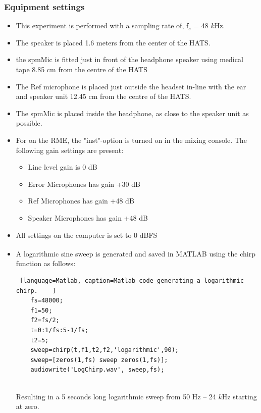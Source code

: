 \subsubsection{Equipment settings}\label{sec:SettingsAngInc}
\begin{itemize}
	\item This experiment is performed with a sampling rate of, f$_{s}$ = 48 $k$Hz.
	\item The speaker is placed 1.6 meters from the center of the HATS.
	\item the spmMic is fitted just in front of the headphone speaker using medical tape 8.85 cm from the centre of the HATS
	\item The Ref microphone is placed just outside the headset in-line with the ear and speaker unit 12.45 cm from the centre of the HATS. 
	\item The spmMic is placed inside the headphone, as close to the speaker unit as possible. 
	\item For on the RME, the "inst"-option is turned on in the mixing console. The following gain settings are present: 		
	\begin{itemize}
		\item Line level gain is 0 dB
		\item Error Microphones has gain +30 dB
		\item Ref Microphones has gain +48 dB
		\item Speaker Microphones has gain +48 dB
	\end{itemize}
	\item All settings on the computer is set to 0 dBFS
	\item A logarithmic sine sweep is generated and saved in MATLAB\textsuperscript{\textregistered} using the chirp function as follows:
	\begin{lstlisting} [language=Matlab, caption=Matlab code generating a logarithmic chirp.	]
	fs=48000;
	f1=50;
	f2=fs/2;
	t=0:1/fs:5-1/fs;
	t2=5;
	sweep=chirp(t,f1,t2,f2,'logarithmic',90);
	sweep=[zeros(1,fs) sweep zeros(1,fs)];
	audiowrite('LogChirp.wav', sweep,fs);
	
	\end{lstlisting}
	Resulting in a 5 seconds long logarithmic sweep from 50 Hz -- 24 $k$Hz starting at zero.
\end{itemize} 
 
